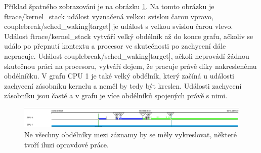 Příklad špatného zobrazování je na obrázku \ref{obr03:modif-noboxes-bad}. Na tomto obrázku je ftrace/kernel\_stack událost vyznačená velkou svislou čarou vpravo, couplebreak/sched\_waking[target] je událost s velkou svislou čarou vlevo. Událost ftrace/kernel\_stack vytváří velký obdélník až do konce grafu, ačkoliv se událo po přepnutí kontextu a procesor ve skutečnosti po zachycení dále nepracuje. Událost couplebreak/sched\_waking[target], ačkoli neprovádí žádnou skutečnou práci na procesoru, vytváří dojem, že pracuje právě díky nakreslenému obdélníčku. V grafu CPU 1 je také velký obdélník, který začíná u události zachycení zásobníku kernelu a neměl by tedy být kreslen. Události zachycení zásobníku jsou časté a v grafu je více obdélníků spojených právě s nimi.

\begin{figure}[p]\centering
    \includegraphics[width=140mm]{img/Modifikace/modif-noboxes-bad}
    \caption{Ne všechny obdélníky mezi záznamy by se měly vykreslovat, některé tvoří iluzi opravdové práce.}
    \label{obr03:modif-noboxes-bad}
\end{figure}